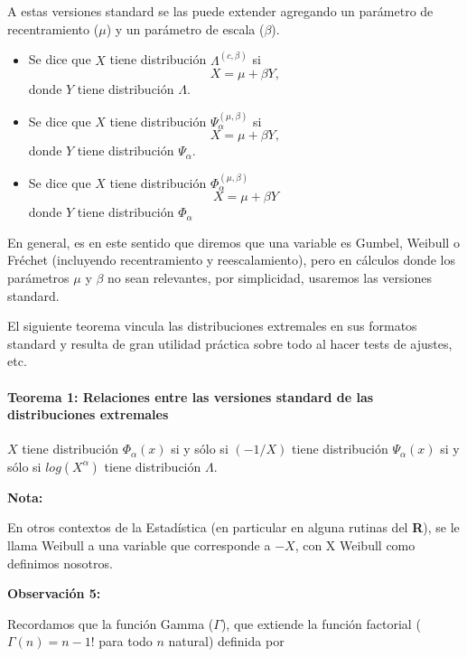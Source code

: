 \documentclass[
  oneside]{book}
\begin{document}
A estas versiones standard se las puede extender agregando un parámetro
de recentramiento (\(\mu\)) y un parámetro de escala (\(\beta\)).

\begin{itemize}
\item Se dice que $X$ tiene distribución $\Lambda^{(c,\beta)}$ si
$$
X=\mu+\beta Y,
$$
donde $Y$ tiene distribución $\Lambda$.
\item Se dice que $X$ tiene distribución $\Psi_{\alpha}^{(\mu,\beta)}$ si 
$$
X=\mu+\beta Y,
$$
donde $Y$ tiene distribución $\Psi_{\alpha}$.

\item  Se dice que $X$ tiene distribución $\Phi_{\alpha}^{(\mu,\beta)}$ 
$$
X=\mu+\beta Y
$$
donde $Y$ tiene distribución $\Phi_{\alpha}$
\end{itemize}

En general, es en este sentido que diremos que una variable es Gumbel,
Weibull o Fréchet (incluyendo recentramiento y reescalamiento), pero en
cálculos donde los parámetros \(\mu\) y \(\beta\) no sean relevantes,
por simplicidad, usaremos las versiones standard.

\newpage

El siguiente teorema vincula las distribuciones extremales en sus
formatos standard y resulta de gran utilidad práctica sobre todo al
hacer tests de ajustes, etc.

\hypertarget{teorema-1-relaciones-entre-las-versiones-standard-de-las-distribuciones-extremales}{%
\paragraph{Teorema 1: Relaciones entre las versiones standard de las
distribuciones
extremales}\label{teorema-1-relaciones-entre-las-versiones-standard-de-las-distribuciones-extremales}}

\(X\) tiene distribución \(\Phi_{\alpha}(x)\) si y sólo si \((-1/X)\)
tiene distribución \(\Psi_{\alpha}(x)\) si y sólo si \(log(X^{\alpha})\)
tiene distribución \(\Lambda\).

\textbf{Nota:}

En otros contextos de la Estadística (en particular en alguna rutinas
del \textbf{R}), se le llama Weibull a una variable que corresponde a
\(-X\), con X Weibull como definimos nosotros.

\textbf{Observación 5:}

Recordamos que la función Gamma (\(\Gamma\)), que extiende la función
factorial (\(\Gamma(n)=n-1!\) para todo \(n\) natural) definida por
\end{document}
